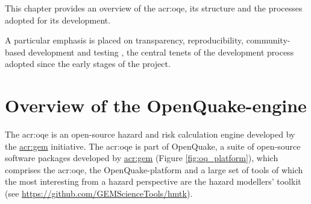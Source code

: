 This chapter provides an overview of the \gls{acr:oqe}, 
its structure and the processes adopted for its development. 

A particular emphasis is placed on transparency, reproducibility,
community-based development and testing \parencite{pagani2014}, the central
tenets of the development process adopted since the early stages of the project. 
%
\section{Overview of the OpenQuake-engine}
%
The \gls{acr:oqe} is an open-source hazard and risk calculation engine 
developed by the 
\href{http://globalquakemodel.org}{\gls{acr:gem}} initiative.
%
The \gls{acr:oqe} is part of OpenQuake, a suite of open-source software packages
developed by \href{http://globalquakemodel.org}{\gls{acr:gem}} (Figure
\ref{fig:oq_platform}), which comprises the \gls{acr:oqe}, the
OpenQuake-platform and a large set of tools of which the most interesting from a
hazard perspective are the hazard modellers' toolkit (see
\href{https://github.com/GEMScienceTools/hmtk}
{https://github.com/GEMScienceTools/hmtk}).

